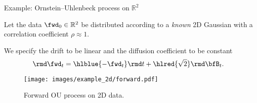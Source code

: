 



\begin{frame}{Example: Ornstein–Uhlenbeck process on $\mathbb{R}^2$}

Let the data $\fwd_0 \in \mathbb{R}^2$ be distributed according to a
\emph{known} 2D Gaussian with a correlation coefficient $\rho \approx 1$.

We specify the drift to be linear and the diffusion coefficient to be constant
\begin{equation}
  \label{eq:example:sde}
    \rmd \fwd_t = \hlblue{- \fwd_t} \rmd t + \hlred{\sqrt{2}} \rmd \bfB_t.
\end{equation}

\begin{figure}
\centering
\texttt{[image: images/example\_2d/forward.pdf]}
\caption{Forward OU process on 2D data.}
\end{figure}
\pause
\vspace{-5mm}
\end{frame}

